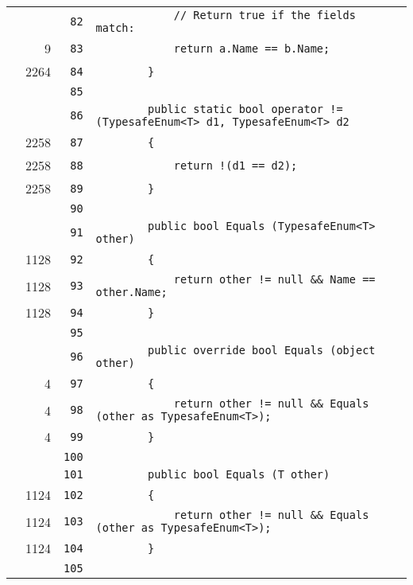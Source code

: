 \documentclass[a4paper,10pt]{article}
\begin{document}
\begin{longtable}[l]{lrrl}
\cellcolor{gray} &  & \verb~82~ & \verb~            // Return true if the fields match:~\\
\cellcolor{green} & 9 & \verb~83~ & \verb~            return a.Name == b.Name;~\\
\cellcolor{green} & 2264 & \verb~84~ & \verb~        }~\\
\cellcolor{gray} &  & \verb~85~ & \verb~~\\
\cellcolor{gray} &  & \verb~86~ & \verb~        public static bool operator != (TypesafeEnum<T> d1, TypesafeEnum<T> d2~\\
\cellcolor{green} & 2258 & \verb~87~ & \verb~        {~\\
\cellcolor{green} & 2258 & \verb~88~ & \verb~            return !(d1 == d2);~\\
\cellcolor{green} & 2258 & \verb~89~ & \verb~        }~\\
\cellcolor{gray} &  & \verb~90~ & \verb~~\\
\cellcolor{gray} &  & \verb~91~ & \verb~        public bool Equals (TypesafeEnum<T> other)~\\
\cellcolor{green} & 1128 & \verb~92~ & \verb~        {~\\
\cellcolor{green} & 1128 & \verb~93~ & \verb~            return other != null && Name == other.Name;~\\
\cellcolor{green} & 1128 & \verb~94~ & \verb~        }~\\
\cellcolor{gray} &  & \verb~95~ & \verb~~\\
\cellcolor{gray} &  & \verb~96~ & \verb~        public override bool Equals (object other)~\\
\cellcolor{green} & 4 & \verb~97~ & \verb~        {~\\
\cellcolor{green} & 4 & \verb~98~ & \verb~            return other != null && Equals (other as TypesafeEnum<T>);~\\
\cellcolor{green} & 4 & \verb~99~ & \verb~        }~\\
\cellcolor{gray} &  & \verb~100~ & \verb~~\\
\cellcolor{gray} &  & \verb~101~ & \verb~        public bool Equals (T other)~\\
\cellcolor{green} & 1124 & \verb~102~ & \verb~        {~\\
\cellcolor{green} & 1124 & \verb~103~ & \verb~            return other != null && Equals (other as TypesafeEnum<T>);~\\
\cellcolor{green} & 1124 & \verb~104~ & \verb~        }~\\
\cellcolor{gray} &  & \verb~105~ & \verb~~\\

\end{longtable}
\end{document}
